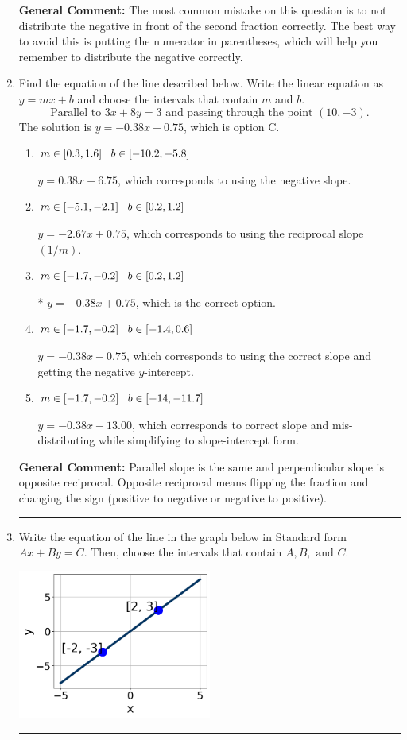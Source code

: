 \documentclass{extbook}[14pt]
\newcommand{\litem}[1]{\item #1

\rule{\textwidth}{0.4pt}}
\begin{document}
\begin{enumerate}
{\textbf{General Comment:} The most common mistake on this question is to not distribute the negative in front of the second fraction correctly. The best way to avoid this is putting the numerator in parentheses, which will help you remember to distribute the negative correctly.
}
\litem{
Find the equation of the line described below. Write the linear equation as $ y=mx+b $ and choose the intervals that contain $m$ and $b$.
\[ \text{Parallel to } 3 x + 8 y = 3 \text{ and passing through the point } (10, -3). \]The solution is \( y = -0.38x + 0.75 \), which is option C.\begin{enumerate}[label=\Alph*.]
\item \( m \in [0.3, 1.6] \hspace*{3mm} b \in [-10.2, -5.8] \)

 $y = 0.38x - 6.75$, which corresponds to using the negative slope.
\item \( m \in [-5.1, -2.1] \hspace*{3mm} b \in [0.2, 1.2] \)

 $y = -2.67x + 0.75$, which corresponds to using the reciprocal slope $(1/m)$.
\item \( m \in [-1.7, -0.2] \hspace*{3mm} b \in [0.2, 1.2] \)

* $y = -0.38x + 0.75$, which is the correct option.
\item \( m \in [-1.7, -0.2] \hspace*{3mm} b \in [-1.4, 0.6] \)

 $y = -0.38x - 0.75$, which corresponds to using the correct slope and getting the negative $y$-intercept.
\item \( m \in [-1.7, -0.2] \hspace*{3mm} b \in [-14, -11.7] \)

 $y = -0.38x - 13.00$, which corresponds to correct slope and mis-distributing while simplifying to slope-intercept form.
\end{enumerate}

\textbf{General Comment:} Parallel slope is the same and perpendicular slope is opposite reciprocal. Opposite reciprocal means flipping the fraction and changing the sign (positive to negative or negative to positive).
}
\litem{
Write the equation of the line in the graph below in Standard form $Ax+By=C$. Then, choose the intervals that contain $A, B, \text{ and } C$.

\begin{center}
    \includegraphics[width=0.5\textwidth]{../Figures/linearGraphToStandardCopyB.png}
\end{center}


}
\end{enumerate}
\end{document}
